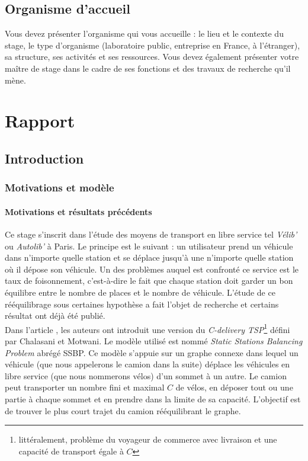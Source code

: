 \documentclass[twoside,11pt,openany,a4paper]{rapport}
\begin{document}
\tableofcontents
{}
\listoffigures
{}

\chapter*{Organisme d'accueil}

Vous devez présenter l’organisme qui vous accueille : le lieu et le contexte du stage, le type d’organisme (laboratoire public, entreprise en France, à l’étranger), sa structure, ses activités et ses ressources. Vous devez également présenter votre maître de stage dans le cadre de ses fonctions et des travaux de recherche qu’il mène.

\part{Rapport}

\chapter{Introduction}

\section{Motivations et modèle}

\subsection{Motivations et résultats précédents}
Ce stage s'inscrit dans l'étude des moyens de transport en libre service tel \emph{Vélib'} ou \emph{Autolib'} à Paris. Le principe est le suivant : un utilisateur prend un véhicule dans n'importe quelle station et se déplace jusqu'à une n'importe quelle station où il dépose son véhicule. Un des problèmes auquel est confronté ce service est le taux de foisonnement, c'est-à-dire le fait que chaque station doit garder un bon équilibre entre le nombre de places et le nombre de véhicule. L'étude de ce rééquilibrage sous certaines hypothèse a fait l'objet de recherche et certains résultat ont déjà été publié.
\\

Dans l'article \cite{Benchimol2011}, les auteurs ont introduit une version du \emph{C-delivery TSP}\footnote{littéralement, problème du voyageur de commerce avec livraison et une capacité de transport égale à $C$} défini par Chalasani et Motwani. Le modèle utilisé est nommé \emph{Static Stations Balancing Problem} abrégé SSBP. Ce modèle s'appuie sur un graphe connexe dans lequel un véhicule (que nous appelerons le camion dans la suite) déplace les véhicules en libre service (que nous nommerons vélos) d'un sommet à un autre. Le camion peut transporter un nombre fini et maximal $C$ de vélos, en déposer tout ou une partie à chaque sommet et en prendre dans la limite de sa capacité. L'objectif est de trouver le plus court trajet du camion rééquilibrant le graphe.
\end{document}
